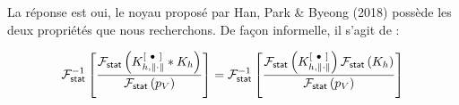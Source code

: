 
La réponse est oui, le noyau proposé par Han, Park \& Byeong (2018) \cite{han2018smooth} possède les deux propriétés que nous recherchons. De façon informelle, il s'agit de :

\begin{equation*}
    \inverse{\mathcal F_{\textsf{stat}}}\left[
        \frac
        {\mathcal F_{\textsf{stat}}\left( 
                K_{h, \lVert \cdot \rVert}^{[\ \bullet \ ]} 
            \ast 
            K_h \right)}
        {\mathcal F_{\textsf{stat}}\left(p_V\right)}
    \right]
    =
    \inverse{\mathcal F_{\textsf{stat}}}\left[
        \frac
        {\mathcal F_{\textsf{stat}}\left( K_{h, \lVert \cdot \rVert}^{[\ \bullet \ ]} \right)\mathcal F_{\textsf{stat}}\left( K_h \right)}
        {\mathcal F_{\textsf{stat}}\left(p_V\right)}
    \right]
\end{equation*}

